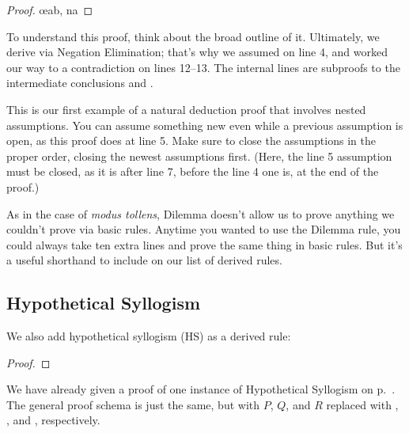 \begin{proof}
	\open
		\open
			\metaA{}
		\close
		\open
			\metaB{}
		\close
		\metaB{}\oe{ab, na}
	\close
	 
\end{proof}

To understand this proof, think about the broad outline of it. Ultimately, we derive \metaC{} via Negation Elimination; that's why we assumed \enot\metaC{} on line 4, and worked our way to a contradiction on lines 12--13. The internal lines are subproofs to the intermediate conclusions \metaB{} and \enot\metaB{}. 

This is our first example of a natural deduction proof that involves nested assumptions. You can assume something new even while a previous assumption is open, as this proof does at line 5. Make sure to close the assumptions in the proper order, closing the newest assumptions first. (Here, the line 5 assumption must be closed, as it is after line 7, before the line 4 one is, at the end of the proof.)

As in the case of \emph{modus tollens}, Dilemma doesn't allow us to prove anything we couldn't prove via basic rules. Anytime you wanted to use the Dilemma rule, you could always take ten extra lines and prove the same thing in basic rules. But it's a useful shorthand to include on our list of derived rules.

\subsection{Hypothetical Syllogism}



We also add hypothetical syllogism (HS) as a derived rule:

\begin{proof}
\end{proof}

We have already given a proof of one instance of Hypothetical Syllogism on p.~\pageref{HSproof}. The general proof schema is just the same, but with $P$, $Q$, and $R$ replaced with \metaA{}, \metaB{}, and \metaC{}, respectively.





